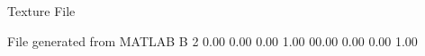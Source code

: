 Texture File

File generated from MATLAB
B 2
   0.00   0.00   0.00   1.00
   00.00   0.00   0.00   1.00